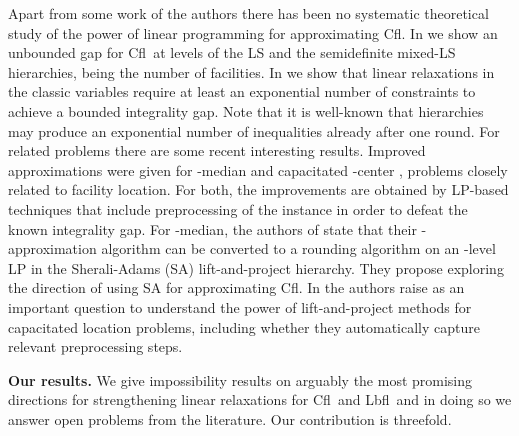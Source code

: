 \documentclass[11pt]{article}
\newcommand{\lbfl}{{\sc Lbfl}}
\newcommand{\cfl}{{\sc Cfl}}
\begin{document}
Apart from some  work of the authors \cite{KolliopoulosM13,KolliopoulosM14b}
there has been no systematic theoretical  study of the power of linear programming
for approximating \cfl.  
In \cite{KolliopoulosM13} we show an unbounded gap for \cfl\ at  levels
of the LS and the semidefinite mixed-LS hierarchies,  being
the number of facilities.  In  
\cite{KolliopoulosM14b} we show that linear relaxations in the classic
variables require at least an exponential number of constraints to
achieve a bounded integrality gap. Note that it is well-known that hierarchies
may produce an exponential number of inequalities already after one
round. 
 For related problems there are  some recent interesting results. 
Improved  approximations  were given  for
-median   \cite{LiS13}      and   capacitated   -center
\cite{CyganHK12,AnBS13},  problems closely  related to
facility location.  For both, the improvements are obtained 
by LP-based techniques
that  include preprocessing  of the  instance in  order to  defeat the
known integrality gap. For -median, the authors of \cite{LiS13}
state that their 
-approximation algorithm   can
be converted  to a  rounding algorithm on an 
 -level LP  in the Sherali-Adams (SA)
lift-and-project hierarchy. 
They propose exploring the  direction of using 
SA  for approximating  \cfl.  In \cite{AnBS13}
the authors raise as an important question  to understand  the
power  of lift-and-project methods  for capacitated  location
problems, including  whether they automatically capture relevant 
preprocessing steps. 



\vspace*{0.3cm}
\noindent
{\bf Our results.}
We give impossibility  results on arguably the most promising 
directions for   strengthening
linear relaxations for \cfl\ and \lbfl\  and in doing so we answer  open
problems from the literature.    Our contribution is threefold. 
\end{document}
